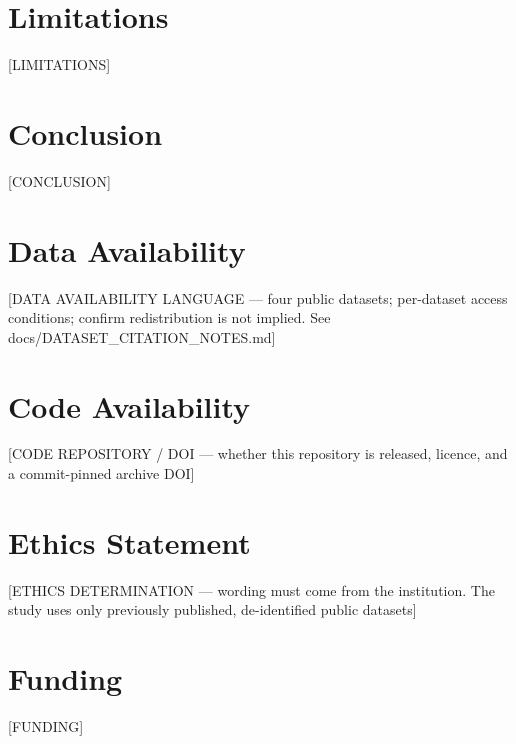 \documentclass[journal]{IEEEtran}
\begin{document}
\section{Limitations}
[LIMITATIONS]

\section{Conclusion}
[CONCLUSION]


\section*{Data Availability}
[DATA AVAILABILITY LANGUAGE --- four public datasets; per-dataset access
 conditions; confirm redistribution is not implied. See
 docs/DATASET\_CITATION\_NOTES.md]

\section*{Code Availability}
[CODE REPOSITORY / DOI --- whether this repository is released, licence,
 and a commit-pinned archive DOI]

\section*{Ethics Statement}
[ETHICS DETERMINATION --- wording must come from the institution. The
 study uses only previously published, de-identified public datasets]

\section*{Funding}
[FUNDING]
\end{document}
